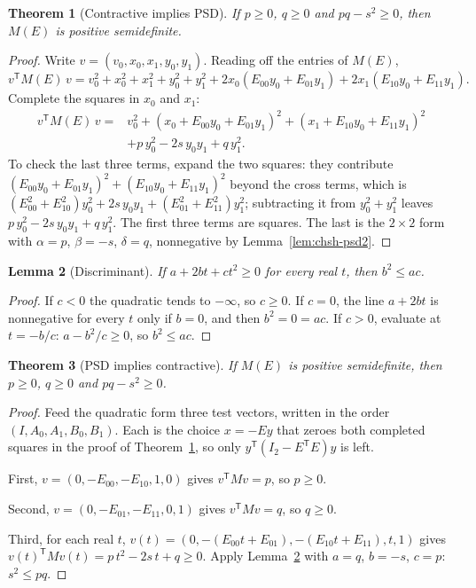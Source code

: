 \documentclass[11pt,twoside]{article}
\theoremstyle{thielethm}
\newtheorem{theorem}{Theorem}[section]
\newtheorem{lemma}[theorem]{Lemma}
\theoremstyle{thieledef}
\theoremstyle{thieledef}
\theoremstyle{thieledef}
\theoremstyle{thielethm}
\theoremstyle{thieleobs}
\theoremstyle{thielethm}
\begin{document}
\begin{theorem}[Contractive implies PSD]\label{thm:chsh-cc-psd}
If $p \ge 0$, $q \ge 0$ and $pq - s^2 \ge 0$, then $M(E)$ is positive semidefinite.
\end{theorem}

\begin{proof}
Write $v = (v_0, x_0, x_1, y_0, y_1)$. Reading off the entries of $M(E)$,
\[
v^{\mathsf T} M(E)\, v = v_0^2 + x_0^2 + x_1^2 + y_0^2 + y_1^2
+ 2x_0(E_{00} y_0 + E_{01} y_1) + 2x_1(E_{10} y_0 + E_{11} y_1).
\]
Complete the squares in $x_0$ and $x_1$:
\[
\begin{aligned}
v^{\mathsf T} M(E)\, v ={}& v_0^2 + (x_0 + E_{00} y_0 + E_{01} y_1)^2
+ (x_1 + E_{10} y_0 + E_{11} y_1)^2 \\
&+ p\, y_0^2 - 2 s\, y_0 y_1 + q\, y_1^2.
\end{aligned}
\]
To check the last three terms, expand the two squares: they contribute
$(E_{00} y_0 + E_{01} y_1)^2 + (E_{10} y_0 + E_{11} y_1)^2$ beyond the cross terms, which is
$(E_{00}^2 + E_{10}^2) y_0^2 + 2 s\, y_0 y_1 + (E_{01}^2 + E_{11}^2) y_1^2$; subtracting it
from $y_0^2 + y_1^2$ leaves $p\, y_0^2 - 2 s\, y_0 y_1 + q\, y_1^2$. The first three terms are
squares. The last is the $2 \times 2$ form with $\alpha = p$, $\beta = -s$, $\delta = q$,
nonnegative by Lemma~\ref{lem:chsh-psd2}.
\end{proof}

\begin{lemma}[Discriminant]\label{lem:chsh-discriminant}
If $a + 2bt + ct^2 \ge 0$ for every real $t$, then
$b^2 \le ac$.
\end{lemma}

\begin{proof}
If $c < 0$ the quadratic tends to $-\infty$, so $c \ge 0$. If $c = 0$, the line
$a + 2bt$ is nonnegative for every $t$ only if $b = 0$, and then $b^2 = 0 = ac$. If $c > 0$,
evaluate at $t = -b/c$: $a - b^2/c \ge 0$, so $b^2 \le ac$.
\end{proof}

\begin{theorem}[PSD implies contractive]\label{thm:chsh-psd-cc}
If $M(E)$ is positive semidefinite, then $p \ge 0$, $q \ge 0$ and $pq - s^2 \ge 0$.
\end{theorem}

\begin{proof}
Feed the quadratic form three test vectors, written in the order
$(I, A_0, A_1, B_0, B_1)$.
Each is the choice $x = -E y$ that zeroes both completed squares in the proof of
Theorem~\ref{thm:chsh-cc-psd}, so only $y^{\mathsf T}(I_2 - E^{\mathsf T} E) y$ is left.

First, $v = (0, -E_{00}, -E_{10}, 1, 0)$ gives $v^{\mathsf T} M v = p$, so $p \ge 0$.

Second, $v = (0, -E_{01}, -E_{11}, 0, 1)$ gives $v^{\mathsf T} M v = q$, so $q \ge 0$.

Third, for each real $t$, $v(t) = (0, -(E_{00} t + E_{01}), -(E_{10} t + E_{11}), t, 1)$
gives $v(t)^{\mathsf T} M v(t) = p\,t^2 - 2 s\,t + q \ge 0$. Apply Lemma~\ref{lem:chsh-discriminant}
with $a = q$, $b = -s$, $c = p$: $s^2 \le pq$.
\end{proof}
\end{document}
